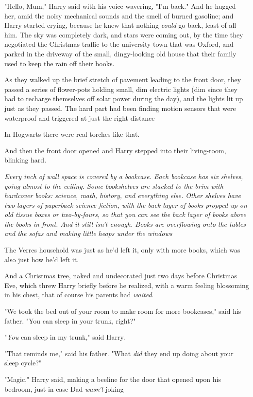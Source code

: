 "Hello, Mum," Harry said with his voice wavering, "I'm back." And he hugged
her, amid the noisy mechanical sounds and the smell of burned gasoline; and
Harry started crying, because he knew that nothing \emph{could} go back, least
of all him.
\sbreak
The sky was completely dark, and stars were coming out, by the time they
negotiated the Christmas traffic to the university town that was Oxford, and
parked in the driveway of the small, dingy-looking old house that their family
used to keep the rain off their books.

As they walked up the brief stretch of pavement leading to the front door, they
passed a series of flower-pots holding small, dim electric lights (dim since
they had to recharge themselves off solar power during the day), and the lights
lit up just as they passed. The hard part had been finding motion sensors that
were waterproof and triggered at just the right distance{\el}

In Hogwarts there were real torches like that.

And then the front door opened and Harry stepped into their living-room,
blinking hard.

\emph{Every inch of wall space is covered by a bookcase. Each bookcase has six
shelves, going almost to the ceiling. Some bookshelves are stacked to the brim
with hardcover books: science, math, history, and everything else. Other
shelves have two layers of paperback science fiction, with the back layer of
books propped up on old tissue boxes or two-by-fours, so that you can see the
back layer of books above the books in front. And it still isn't enough. Books
are overflowing onto the tables and the sofas and making little heaps under the
windows{\el}}

The Verres household was just as he'd left it, only with more books, which was
also just how he'd left it.

And a Christmas tree, naked and undecorated just two days before Christmas Eve,
which threw Harry briefly before he realized, with a warm feeling blossoming in
his chest, that of course his parents had \emph{waited}.

"We took the bed out of your room to make room for more bookcases," said his
father. "You can sleep in your trunk, right?"

"\emph{You} can sleep in my trunk," said Harry.

"That reminds me," said his father. "What \emph{did} they end up doing about
your sleep cycle?"

"Magic," Harry said, making a beeline for the door that opened upon his
bedroom, just in case Dad \emph{wasn't} joking{\el}

